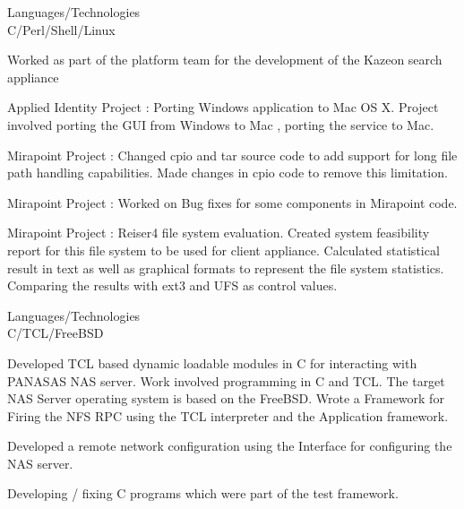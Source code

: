 \documentclass[a4,11pt]{cv4tw}
\begin{document}
{Languages/Technologies \\ C/Perl/Shell/Linux}
	{ 
	\begin{missions}		
		\item Worked as part of the platform team for the development of the Kazeon search appliance
		\item Applied Identity Project : Porting Windows application to Mac OS X. Project involved porting the GUI from Windows to Mac , porting the service to Mac.
		\item Mirapoint Project : Changed cpio and tar source code to add support for long file path handling capabilities. Made changes in cpio code to remove this limitation.
		\item Mirapoint Project : Worked on Bug fixes for some components in Mirapoint code.
		\item Mirapoint Project : Reiser4 file system evaluation. Created system feasibility report for this file system to be used for client appliance. Calculated statistical result in text as well as graphical formats to represent the file system statistics. Comparing the results with ext3 and UFS as control values.
	\end{missions}
}

{Languages/Technologies \\ C/TCL/FreeBSD}
	{ 
	\begin{missions}		
		\item Developed TCL based dynamic loadable modules in C for interacting with PANASAS NAS server. Work involved programming in C and TCL. The target NAS Server operating system is based on the FreeBSD. Wrote a Framework for Firing the NFS RPC using the TCL interpreter and the Application framework.
		\item Developed a remote network configuration using the  Interface for configuring the NAS server.
		\item Developing / fixing C programs which were part of the test framework.
	\end{missions}	
}	
\end{document}
